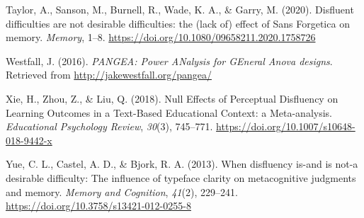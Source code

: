\documentclass[
  english,
  jou]{apa6}
\begin{document}
\leavevmode\hypertarget{ref-Taylor2020}{}%
Taylor, A., Sanson, M., Burnell, R., Wade, K. A., \& Garry, M. (2020). Disfluent difficulties are not desirable difficulties: the (lack of) effect of Sans Forgetica on memory. \emph{Memory}, 1--8. \url{https://doi.org/10.1080/09658211.2020.1758726}

\leavevmode\hypertarget{ref-Westfall2016}{}%
Westfall, J. (2016). \emph{PANGEA: Power ANalysis for GEneral Anova designs}. Retrieved from \url{http://jakewestfall.org/pangea/}

\leavevmode\hypertarget{ref-Xie2018}{}%
Xie, H., Zhou, Z., \& Liu, Q. (2018). Null Effects of Perceptual Disfluency on Learning Outcomes in a Text-Based Educational Context: a Meta-analysis. \emph{Educational Psychology Review}, \emph{30}(3), 745--771. \url{https://doi.org/10.1007/s10648-018-9442-x}

\leavevmode\hypertarget{ref-Yue2013}{}%
Yue, C. L., Castel, A. D., \& Bjork, R. A. (2013). When disfluency is-and is not-a desirable difficulty: The influence of typeface clarity on metacognitive judgments and memory. \emph{Memory and Cognition}, \emph{41}(2), 229--241. \url{https://doi.org/10.3758/s13421-012-0255-8}

\endgroup
\end{document}

